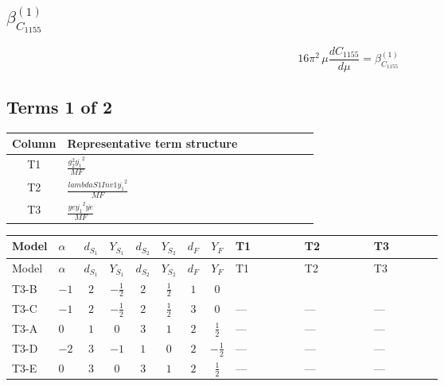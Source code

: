 \documentclass[8pt]{article}
\begin{document}
\begin{landscape}
\section*{$\beta_{C_{1155}}^{(1)}$}
\[16\pi^2\,\mu\frac{d C_{1155}}{d\mu}=\beta_{C_{1155}}^{(1)}\]
\subsection*{Terms 1 of 2}
\begin{center}
\begin{tabular}{@{}c >{\raggedright\arraybackslash}p{0.82\linewidth}@{}}
\toprule
Column & Representative term structure \\
\midrule
T1 & \(\displaystyle \frac{g_{2}^{2} \overline{y_{1}}^{2}}{MF}\) \\
\midrule
T2 & \(\displaystyle \frac{lambdaS1Inv1 \overline{y_{1}}^{2}}{MF}\) \\
\midrule
T3 & \(\displaystyle \frac{ye \overline{y_{1}}^{2} \overline{ye}}{MF}\) \\
\midrule
\bottomrule
\end{tabular}
\end{center}
\smallskip
\tiny
\begin{longtable}{@{}llcccccc >{\raggedright\arraybackslash}p{0.21\linewidth} >{\raggedright\arraybackslash}p{0.21\linewidth} >{\raggedright\arraybackslash}p{0.21\linewidth}@{}}
\toprule
Model & $\alpha$ & $d_{S_1}$ & $Y_{S_1}$ & $d_{S_2}$ & $Y_{S_2}$ & $d_F$ & $Y_F$ & T1 & T2 & T3 \\
\midrule
\endfirsthead
\toprule
Model & $\alpha$ & $d_{S_1}$ & $Y_{S_1}$ & $d_{S_2}$ & $Y_{S_2}$ & $d_F$ & $Y_F$ & T1 & T2 & T3 \\
\midrule
\endhead
T3-B & $-1$ & $2$ & $-\frac{1}{2}$ & $2$ & $\frac{1}{2}$ & $1$ & $0$ & \scriptsize\adjustbox{max width=\linewidth}{$\begin{gathered} - \frac{3 g_{2}^{2} \overline{y_{1}}^{2}}{4 MF}\end{gathered}$} & \scriptsize\adjustbox{max width=\linewidth}{$\begin{gathered} - \frac{lambdaS1Inv1 \overline{y_{1}}^{2}}{2 MF}\end{gathered}$} & \scriptsize\adjustbox{max width=\linewidth}{$\begin{gathered} \frac{ye \overline{y_{1}}^{2} \overline{ye}}{4 MF}\end{gathered}$} \\
\midrule
T3-C & $-1$ & $2$ & $-\frac{1}{2}$ & $2$ & $\frac{1}{2}$ & $3$ & $0$ & --- & --- & --- \\
\midrule
T3-A & $0$ & $1$ & $0$ & $3$ & $1$ & $2$ & $\frac{1}{2}$ & --- & --- & --- \\
\midrule
T3-D & $-2$ & $3$ & $-1$ & $1$ & $0$ & $2$ & $-\frac{1}{2}$ & --- & --- & --- \\
\midrule
T3-E & $0$ & $3$ & $0$ & $3$ & $1$ & $2$ & $\frac{1}{2}$ & --- & --- & --- \\
\midrule
\bottomrule
\end{longtable}
\clearpage

\end{landscape}
\end{document}
